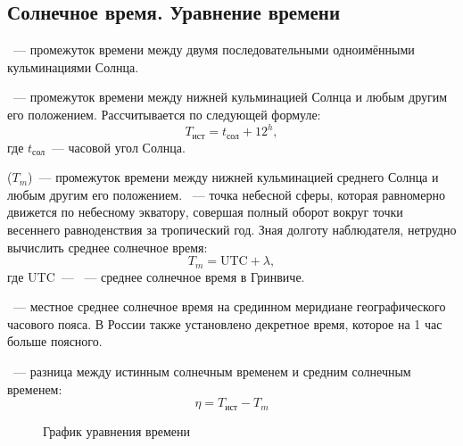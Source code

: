 \subsection{Солнечное время. Уравнение времени}
~--- промежуток времени между двумя последовательными одноимёнными кульминациями Солнца.

~--- промежуток времени между нижней кульминацией Солнца и любым другим его положением. Рассчитывается по следующей формуле:
\begin{equation}
T_{\text{ист}}=t_{\text{сол}}+12^h,
\end{equation}
где $t_{\text{сол}}$~--- часовой угол Солнца.

 ($T_m$)~--- промежуток времени между нижней
кульминацией среднего Солнца и любым другим его положением. ~--- точка небесной сферы, которая равномерно движется по небесному экватору, совершая полный оборот вокруг точки весеннего равноденствия за тропический год. Зная долготу наблюдателя, нетрудно вычислить среднее солнечное время:
\begin{equation}
T_m = \text{UTC} + \lambda,
\end{equation}
где UTC~--- ~--- среднее солнечное время в Гринвиче.

~--- местное среднее солнечное время на срединном меридиане географического часового пояса. В России также установлено декретное время, которое на 1 час больше поясного.


~--- разница между истинным солнечным временем и средним солнечным временем:
\begin{equation}
\eta=T_{\text{ист}}-T_m
\end{equation}
\begin{figure}[h!]
	\centering
	\vspace{-.7pc}
	\caption{График уравнения времени}
\end{figure}